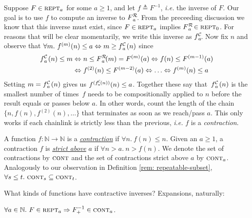 Suppose $F \in \text{\scshape{rept}}_a$ for some $a \ge 1$, and
let $f \triangleq F^{-1}$, \emph{i.e.} the inverse of $F$.
Our goal is to use $f$ to compute an inverse to $\rf{F}{a}$.
From the preceeding discussion we know that this inverse must exist,
since $F \in \text{\scshape{rept}}_a$ implies $\rf{F}{a} \in \repeatable_0$.
For reasons that will be clear momentarily, we write this inverse as $\cdt{f}{a}$.  Now
fix $n$ and observe that $\forall m.~f^{(m)}(n)\le a \iff m \ge \cdt{f}{a}(n)$
since
\vspace{-0.5em}
\begin{equation} \label{eq: rf-upp-inv}
\begin{aligned}
\cdt{f}{a}(n)\le m & \iff n\le \rf{F}{a}(m) = F^{(m)}(a) \iff f(n)\le F^{(m-1)}(a) \\
& \iff f^{(2)}(n)\le F^{(m-2)}(a) \iff \ldots \iff f^{(m)}(n)\le a
\end{aligned}
\vspace{-0.5em}
\end{equation}
Setting $m = \cdt{f}{a}(n)$ gives us
$f^{(\cdt{f}{a}(n))}(n) \le a$.
Together these say that~$\cdt{f}{a}(n)$ is the smallest number of
times~$f$ needs to be compositionally applied to $n$ before the result
equals or passes below $a$.
In other words, count the length of the chain $\{n, f(n), f^{(2)}(n), \ldots\}$ that
terminates as soon as we reach/pass $a$.
This only works if each chainlink is strictly less than the previous,
\emph{i.e.} $f$ is a \emph{contraction}.
\begin{defn} \label{defn: contracting}
	A function $f : \mathbb{N} \to \mathbb{N}$ is a
	\href{https://github.com/inv-ack/inv-ack/blob/7270e64a2600b771f2b1b1b151f7d13fb2ae6c97/countdown.v#L40-L42}{\emph{contraction}} if $\forall n.~ f(n) \le n$. Given an $a \ge 1$, a contraction $f$ is
	\href{https://github.com/inv-ack/inv-ack/blob/7270e64a2600b771f2b1b1b151f7d13fb2ae6c97/countdown.v#L44-L46}{\emph{strict above}} $a$ if $\forall n > a.~n > f(n)$. We denote the set of contractions by $\text{\scshape{cont}}$ and the set of contractions strict above $a$ by $\text{\scshape{cont}}_a$. Analogously to our observation in
	Definition \ref{rem: repeatable-subset}, $\forall s\le t.~ \text{\scshape{cont}}_s \subseteq \text{\scshape{cont}}_t$.
\end{defn}
What kinds of functions have contractive inverses? Expansions, naturally:
\begin{thm} \label{thm: expansion-inv-contraction}
$\forall a\in \mathbb{N}.~F\in \text{\scshape{rept}}_a \Rightarrow F^{-1}_+ \in \text{\scshape{cont}}_a$.
\end{thm}
